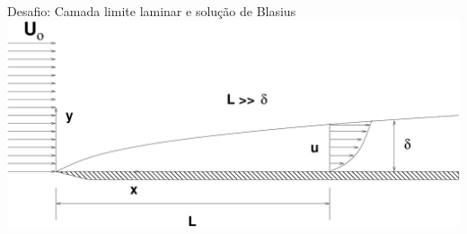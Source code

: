 \documentclass{beamer}
\begin{document}
\begin{frame}{Desafio: Camada limite laminar e solução de Blasius}
\centering
\includegraphics[width=\textwidth]{./figuras/camada-limite.pdf}

\end{frame}
\end{document}
